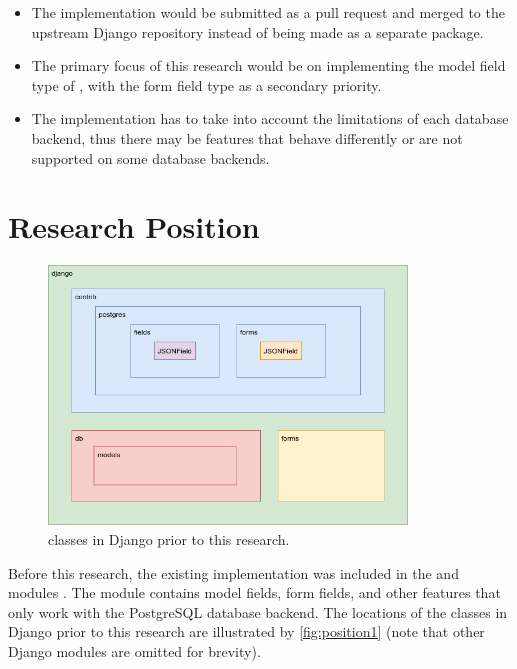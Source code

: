 \begin{itemize}
    \item The  implementation would be submitted as a pull
          request and merged to the upstream Django repository instead of being
          made as a separate package.
    \item The primary focus of this research would be on implementing the model
          field type of , with the form field type as a
          secondary priority.
    \item The  implementation has to take into account the
          limitations of each database backend, thus there may be features that
          behave differently or are not supported on some database backends.
\end{itemize}

\section{Research Position}

\begin{figure}
	\centering
    \includegraphics[width=0.85\textwidth]{pics/position1.png}
	\caption{ classes in Django prior to this research.}
	\label{fig:position1}
\end{figure}

Before this research, the existing  implementation was included
in the  and
 modules \cite{django30_modeljsonfield,
django30_formjsonfield}. The  module contains
model fields, form fields, and other features that only work with the
PostgreSQL database backend. The locations of the  classes in
Django prior to this research are illustrated by \autoref{fig:position1} (note
that other Django modules are omitted for brevity).

